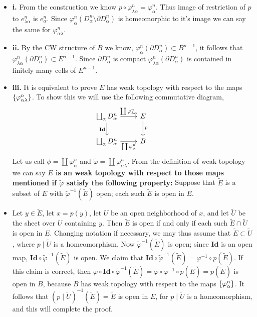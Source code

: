 \documentclass[11pt]{article}
\newcommand{\p}{\partial}
\newcommand{\ts}[1]{\textbf{\textsf{#1}}}
\newcommand{\id}{\mathbf{Id}}
\begin{document}
\begin{itemize}
   \item[]\ts{i.} From the construction we know $p \circ \varphi_{\lambda \alpha}^n=\varphi_{\alpha}^n$. Thus image of restriction of $p$ to $e^n_{\lambda \alpha}$ is $e^n_{\alpha}$. Since $\varphi_{\alpha}^n ( D^n_{\alpha} \setminus \p D^n_{\alpha})$ is homeomorphic to it's image we can say the same for $\varphi^n_{\alpha \lambda}$.
   \item[] \ts{ii.} By the CW structure of $B$ we know, $\varphi_{\alpha}^n(\p D^n_{\alpha}) \subset B^{n-1}$, it follows that $\varphi^n_{\lambda \alpha} (\p D^n_{\alpha})\subset E^{n-1}$. Since $\p D^n_{\alpha}$ is compact $\varphi^n_{\lambda \alpha} (\p D^n_{\alpha})$ is contained in finitely many cells of $E^{n-1}$.
   \item[] \ts{iii.} It is equivalent to prove $E$ has weak topology with respect to the maps $\qty{\varphi^n_{\alpha \lambda}}$. To show this we will use the following commutative diagram, \[\begin{tikzcd}
      {\bigsqcup_{\alpha}D^n_{\alpha}} & E \\
      {\bigsqcup_{\alpha} D_{\alpha}^n} & B & {}
      \arrow["{\coprod \varphi^n_{\lambda\alpha}}", from=1-1, to=1-2]
      \arrow["\id"', from=1-1, to=2-1]
      \arrow["{\coprod \varphi^n_{\alpha}}"', from=2-1, to=2-2]
      \arrow["p", from=1-2, to=2-2]
   \end{tikzcd}\]
   Let us call $\phi = \coprod \varphi^n_{\alpha}$ and $\tilde{\varphi} = \coprod \varphi^n_{\alpha \lambda}$. From the definition of weak topology we can say \textbf{$E$ is an weak topology with respect to those maps mentioned if $\tilde{\varphi}$ satisfy the following property:} Suppose that $\widetilde{E}$ is a subset of $E$ with $\tilde{\varphi}^{-1}(\widetilde{E})$ open; each such $\widetilde{E}$ is open in $E$. 
   \item[] Let $y \in \widetilde{E}$, let $x=p(y)$, let $U$ be an open neighborhood of $x$, and let $\widetilde{U}$ be the sheet over $U$ containing $y$. Then $\widetilde{E}$ is open if and only if each such $\widetilde{E} \cap \tilde{U}$ is open in $E$. Changing notation if necessary, we may thus assume that $\widetilde{E} \subset \tilde{U}$, where $p \mid \tilde{U}$ is a homeomorphism. Now $\tilde{\varphi}^{-1}(\widetilde{E})$ is open; since $\id$ is an open map, $\id \circ \tilde{\varphi}^{-1}(\widetilde{E})$ is open. We claim that $\id \circ \tilde{\varphi}^{-1}(\widetilde{E})=\varphi^{-1} \circ p(\widetilde{E})$. If this claim is correct, then $\varphi \circ \id \circ \tilde{\varphi}^{-1}(\widetilde{E})=\varphi \circ \varphi^{-1} \circ p(\widetilde{E})=p(\widetilde{E})$ is open in $B$, because $B$ has weak topology with respect to the maps $\qty{\varphi_{\alpha}^n}$. It follows that $(p \mid \tilde{U})^{-1}(\widetilde{E})=\widetilde{E}$ is open in $E$, for $p \mid \widetilde{U}$ is a homeomorphism, and this will complete the proof.
   

\end{itemize}
\end{document}
